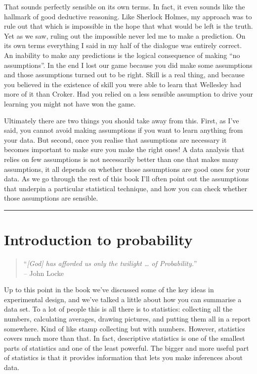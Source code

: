 \documentclass[
  a4paper,
]{book}
\begin{document}
That sounds perfectly sensible on its own terms. In fact, it even sounds
like the hallmark of good deductive reasoning. Like Sherlock Holmes, my
approach was to rule out that which is impossible in the hope that what
would be left is the truth. Yet as we saw, ruling out the impossible
never led me to make a prediction. On its own terms everything I said in
my half of the dialogue was entirely correct. An inability to make any
predictions is the logical consequence of making ``no assumptions''. In
the end I lost our game because you did make some assumptions and those
assumptions turned out to be right. Skill is a real thing, and because
you believed in the existence of skill you were able to learn that
Wellesley had more of it than Croker. Had you relied on a less sensible
assumption to drive your learning you might not have won the game.

Ultimately there are two things you should take away from this. First,
as I've said, you cannot avoid making assumptions if you want to learn
anything from your data. But second, once you realise that assumptions
are necessary it becomes important to make sure you make the right ones!
A data analysis that relies on few assumptions is not necessarily better
than one that makes many assumptions, it all depends on whether those
assumptions are good ones for your data. As we go through the rest of
this book I'll often point out the assumptions that underpin a
particular statistical technique, and how you can check whether those
assumptions are sensible.

\begin{center}\rule{0.5\linewidth}{0.5pt}\end{center}

\hypertarget{sec-Introduction-to-probability}{%
\chapter{Introduction to
probability}\label{sec-Introduction-to-probability}}

\begin{quote}
``\emph{{[}God{]} has afforded us only the twilight \ldots{} of
Probability.}''\\
-- John Locke
\end{quote}

Up to this point in the book we've discussed some of the key ideas in
experimental design, and we've talked a little about how you can
summarise a data set. To a lot of people this is all there is to
statistics: collecting all the numbers, calculating averages, drawing
pictures, and putting them all in a report somewhere. Kind of like stamp
collecting but with numbers. However, statistics covers much more than
that. In fact, descriptive statistics is one of the smallest parts of
statistics and one of the least powerful. The bigger and more useful
part of statistics is that it provides information that lets you make
inferences about data.
\end{document}
